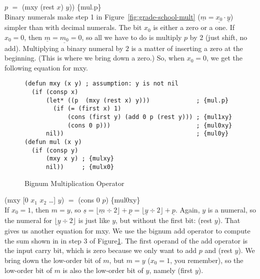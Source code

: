 \hspace*{2cm} $p$ $=$ \textsf{(mxy (rest $x$) $y$))} \hfill \{mul.p\}
\\

Binary numerals make step 1 in Figure~\ref{fig:grade-school-mult}
($\underline{m} = \underline{x_0} \cdot \underline{y}$)
simpler than with decimal numerals.
The bit $x_0$ is either a zero or a one.
If $x_0 = 0$, then $\underline{m} = \underline{m_0} = 0$, so all
we have to do is multiply $p$ by $2$ (just shift, no add).
Multiplying a binary numeral by $2$ is a matter
of inserting a zero at the beginning.
(This is where we bring down a zero.)
So, when $x_0 = 0$, we get the following equation for \textsf{mxy}.

\begin{figure}
\begin{Verbatim}
(defun mxy (x y) ; assumption: y is not nil
  (if (consp x)
      (let* ((p  (mxy (rest x) y)))             ; {mul.p}
        (if (= (first x) 1)
            (cons (first y) (add 0 p (rest y))) ; {mul1xy}
            (cons 0 p)))                        ; {mul0xy}
      nil))                                     ; {mul0y}
(defun mul (x y)
  (if (consp y)
      (mxy x y) ; {mulxy}
      nil))     ; {mulx0}
\end{Verbatim}
\label{bignum-mul-defun}
\caption{Bignum Multiplication Operator}
\label{fig:bignum-mul-defun}
\end{figure}

\hspace*{2cm} \textsf{(mxy [$0$ $x_1$ $x_2$ \dots] $y$)} $=$ \textsf{(cons $0$ $p$)} \hfill \{mul0xy\}
\\

If $x_0 = 1$, then $m = y$,
so $\underline{s} = \lfloor \underline{m}\div 2\rfloor + \underline{p} = \lfloor \underline{y}\div 2\rfloor + \underline{p}$.
Again, $y$ is a numeral, so the numeral for $\lfloor \underline{y}\div 2\rfloor$
is just like $y$, but without the first bit: (rest $y$).
That gives us another equation for \textsf{mxy}.
We use the bignum add operator to compute the sum
shown in in step 3 of Figure\ref{fig:bignum-mul-defun}.
The first operand of the \textsf{add} operator is the input carry bit,
which is zero because we only want to add $p$ and \textsf{(rest $y$)}.
We bring down the low-order bit of $m$, but $m = y$
($x_0 = 1$, you remember), so the low-order bit of $m$
is also the low-order bit of $y$, namely \textsf{(first $y$)}.

